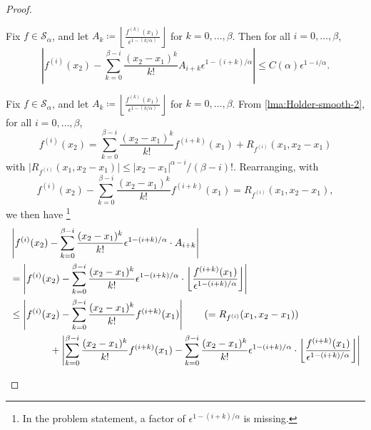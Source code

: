 \begin{proof}
	\begin{claim}\label{clm:metric-entropy-c}
		Fix \(f\in \mathcal{S} _\alpha \), and let \(A_k \coloneqq \left\lfloor \frac{f^{(k)}(x_1)}{\epsilon ^{1 - (k / \alpha )}} \right\rfloor\) for \(k = 0, \dots , \beta \). Then for all \(i = 0, \dots , \beta \),
		\[
			\left\vert f^{(i)} (x_2) - \sum_{k=0}^{\beta -i} \frac{(x_2 - x_1)^k}{k!} A_{i+k} \epsilon ^{1 - (i + k) / \alpha } \right\vert \leq C(\alpha ) \epsilon ^{1 - i / \alpha }.
		\]
	\end{claim}
	\begin{explanation}
		Fix \(f\in \mathcal{S} _\alpha \), and let \(A_k \coloneqq \left\lfloor \frac{f^{(k)}(x_1)}{\epsilon ^{1 - (k / \alpha )}} \right\rfloor\) for \(k = 0, \dots , \beta \). From \autoref{lma:Holder-smooth-2}, for all \(i=0, \dots , \beta \),
		\[
			f^{(i)}(x_2) = \sum_{k=0}^{\beta - i} \frac{(x_2 - x_1)^k}{k!}f^{(i+k)}(x_1) + R_{f^{(i)}}(x_1, x_2 - x_1)
		\]
		with \(\vert R_{f^{(i)}} (x_1, x_2 - x_1)\vert \leq \vert x_2 - x_1 \vert ^{\alpha - i} / (\beta - i)!\). Rearranging, with
		\[
			f^{(i)}(x_2) - \sum_{k=0}^{\beta - i} \frac{(x_2 - x_1)^k}{k!}f^{(i+k)}(x_1) = R_{f^{(i)}}(x_1, x_2 - x_1),
		\]
		we then have \footnote{In the problem statement, a factor of \(\epsilon ^{1 - (i + k) / \alpha }\) is missing.}
		\begin{align*}
			 & \left\vert f^{(i)}(x_2) - \sum_{k=0}^{\beta -i} \frac{(x_2 - x_1)^k}{k!} \epsilon ^{1 - (i + k) / \alpha } \cdot A_{i + k} \right\vert                                                                                                                                                                                   \\
			 & = \left\vert f^{(i)}(x_2) - \sum_{k=0}^{\beta -i} \frac{(x_2 - x_1)^k}{k!} \epsilon ^{1 - (i + k) / \alpha } \cdot \left\lfloor \frac{f^{(i + k)}(x_1)}{\epsilon ^{1 - (i + k) / \alpha }} \right\rfloor \right\vert                                                                                                     \\
			 & \leq \left\vert f^{(i)}(x_2) - \sum_{k=0}^{\beta - i} \frac{(x_2 - x_1)^k}{k!}f^{(i+k)}(x_1) \right\vert \tag*{(\(= R_{f^{(i)}} (x_1, x_2 - x_1)\))}                                                                                                                                                                     \\
			 & \qquad\qquad + \left\vert \sum_{k=0}^{\beta - i} \frac{(x_2 - x_1)^k}{k!}f^{(i+k)}(x_1) - \sum_{k=0}^{\beta -i} \frac{(x_2 - x_1)^k}{k!} \epsilon ^{1 - (i + k) / \alpha } \cdot \left\lfloor \frac{f^{(i + k)}(x_1)}{\epsilon ^{1 - (i + k) / \alpha }} \right\rfloor \right\vert                                       \\

\end{align*}
\end{explanation}
\end{proof}

